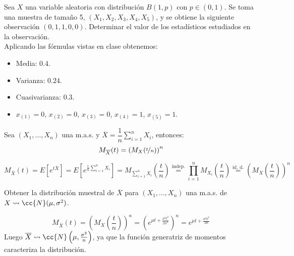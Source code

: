 \begin{ejercicio}
    Sea $X$ una variable aleatoria con distribución $B(1,p)$ con $p\in (0,1)$. Se toma una muestra de tamaño 5, $(X_1, X_2, X_3, X_4, X_5)$, y se obtiene la siguiente observación $(0,1,1,0,0)$. Determinar el valor de los estadísticos estudiados en la observación.\\

    \noindent
    Aplicando las fórmulas vistas en clase obtenemos:
    \begin{itemize}
        \item Media: $0.4$.
        \item Varianza: $0.24$.
        \item Cuasivarianza: $0.3$.
        \item $x_{(1)} = 0$, $x_{(2)} = 0$, $x_{(3)} = 0$, $x_{(4)} = 1$, $x_{(5)} = 1$.
    \end{itemize}
\end{ejercicio}

\begin{ejercicio}
    Sea $(X_1, \ldots, X_n)$ una m.a.s. y $\overline{X} = \dfrac{1}{n}\sum\limits_{i=1}^{n}X_i$, entonces:
    \begin{equation*}
        M_{\overline{X}}(t) = {(M_X(\nicefrac{t}{n}))}^{n}
    \end{equation*}

    \begin{equation*}
        M_{\overline{X}}(t) = E\left[e^{t\overline{X}}\right] = E\left[e^{\frac{t}{n}\sum\limits_{i=1}^{n}X_i}\right] = M_{\sum\limits_{i=1}^{n}X_i}\left(\frac{t}{n}\right) \stackrel{\text{indep.}}{=} \prod_{i=1}^{n} M_{X_i}\left(\frac{t}{n}\right) \stackrel{\text{id. d.}}{=} {\left(M_X\left(\frac{t}{n}\right)\right)}^{n}
    \end{equation*}
\end{ejercicio}

\begin{ejercicio}
    Obtener la distribución muestral de $\overline{X}$ para $(X_1, \ldots, X_n)$ una m.a.s. de $X\rightsquigarrow \cc{N}(\mu, \sigma^2)$.

    \begin{equation*}
        M_{\overline{X}}(t) = {\left(M_X\left(\frac{t}{n}\right)\right)}^{n} = {\left(e^{\mu t + \frac{\sigma^2 t^2}{2n^2}}\right)}^{n} = e^{\mu t + \frac{\sigma^2 t^2}{2n}}
    \end{equation*}
    Luego $\overline{X}\rightsquigarrow \cc{N}\left(\mu, \frac{\sigma^2}{n}\right)$, ya que la función generatriz de momentos caracteriza la distribución.
\end{ejercicio}


